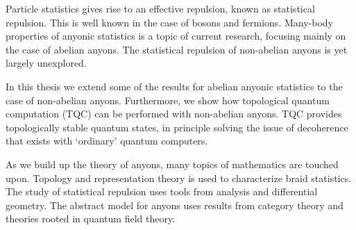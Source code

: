 Particle statistics gives rise to an effective repulsion, known as statistical repulsion. This is well known in the case of bosons and fermions. Many-body properties of anyonic statistics is a topic of current research, focusing mainly on the case of abelian anyons. The statistical repulsion of non-abelian anyons is yet largely unexplored.

In this thesis we extend some of the results for abelian anyonic statistics to the case of non-abelian anyons. Furthermore, we show how topological quantum computation (TQC) can be performed with non-abelian anyons. TQC provides topologically stable quantum states, in principle solving the issue of decoherence that exists with `ordinary' quantum computers.

As we build up the theory of anyons, many topics of mathematics are touched upon. Topology and representation theory is used to characterize braid statistics. The study of statistical repulsion uses tools from analysis and differential geometry. The abstract model for anyons uses results from category theory and theories rooted in quantum field theory.
